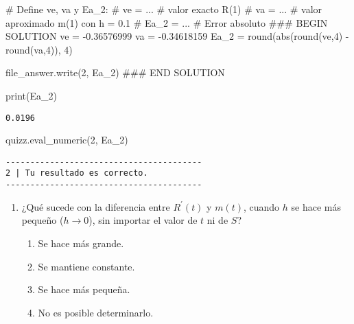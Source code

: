 \documentclass[
  letterpaper,
  DIV=11,
  numbers=noendperiod]{scrreprt}
\newenvironment{Shaded}{\begin{snugshade}}{\end{snugshade}}
\newcommand{\BuiltInTok}[1]{\textcolor[rgb]{0.00,0.23,0.31}{#1}}
\newcommand{\CommentTok}[1]{\textcolor[rgb]{0.37,0.37,0.37}{#1}}
\newcommand{\DecValTok}[1]{\textcolor[rgb]{0.68,0.00,0.00}{#1}}
\newcommand{\FloatTok}[1]{\textcolor[rgb]{0.68,0.00,0.00}{#1}}
\newcommand{\NormalTok}[1]{\textcolor[rgb]{0.00,0.23,0.31}{#1}}
\newcommand{\OperatorTok}[1]{\textcolor[rgb]{0.37,0.37,0.37}{#1}}
\newcommand{\RegionMarkerTok}[1]{\textcolor[rgb]{0.00,0.23,0.31}{#1}}
\newcommand{\StringTok}[1]{\textcolor[rgb]{0.13,0.47,0.30}{#1}}
\providecommand{\tightlist}{%
  \setlength{\itemsep}{0pt}\setlength{\parskip}{0pt}}\usepackage{longtable,booktabs,array}
\begin{document}
\begin{Shaded}
\begin{Highlighting}[]
\CommentTok{\# Define ve, va y Ea\_2:}
\CommentTok{\# ve = ... \# valor exacto R\textquotesingle{}(1) }
\CommentTok{\# va = ... \# valor aproximado m(1) con h = 0.1}
\CommentTok{\# Ea\_2 = ... \# Error absoluto}
\CommentTok{\#\#\# }\RegionMarkerTok{BEGIN}\CommentTok{ SOLUTION}
\NormalTok{ve }\OperatorTok{=} \OperatorTok{{-}}\FloatTok{0.36576999}
\NormalTok{va }\OperatorTok{=} \OperatorTok{{-}}\FloatTok{0.34618159}
\NormalTok{Ea\_2 }\OperatorTok{=} \BuiltInTok{round}\NormalTok{(}\BuiltInTok{abs}\NormalTok{(}\BuiltInTok{round}\NormalTok{(ve,}\DecValTok{4}\NormalTok{) }\OperatorTok{{-}} \BuiltInTok{round}\NormalTok{(va,}\DecValTok{4}\NormalTok{)), }\DecValTok{4}\NormalTok{)}

\NormalTok{file\_answer.write(}\StringTok{\textquotesingle{}2\textquotesingle{}}\NormalTok{, Ea\_2)}
\CommentTok{\#\#\# }\RegionMarkerTok{END}\CommentTok{ SOLUTION}

\BuiltInTok{print}\NormalTok{(Ea\_2)}
\end{Highlighting}
\end{Shaded}

\begin{verbatim}
0.0196
\end{verbatim}

\begin{Shaded}
\begin{Highlighting}[]
\NormalTok{quizz.eval\_numeric(}\StringTok{\textquotesingle{}2\textquotesingle{}}\NormalTok{, Ea\_2)}
\end{Highlighting}
\end{Shaded}

\begin{verbatim}
----------------------------------------
2 | Tu resultado es correcto.
----------------------------------------
\end{verbatim}

\begin{enumerate}
\def\labelenumi{\arabic{enumi}.}
\setcounter{enumi}{2}
\tightlist
\item
  ¿Qué sucede con la diferencia entre \(R^\prime(t)\) y \(m(t)\), cuando
  \(h\) se hace más pequeño (\(h\to 0\)), sin importar el valor de \(t\)
  ni de \(S\)?

  \begin{enumerate}
  \def\labelenumii{\arabic{enumii}.}
  \tightlist
  \item
    Se hace más grande.
  \item
    Se mantiene constante.
  \item
    Se hace más pequeña.
  \item
    No es posible determinarlo.
  \end{enumerate}
\end{enumerate}
\end{document}
